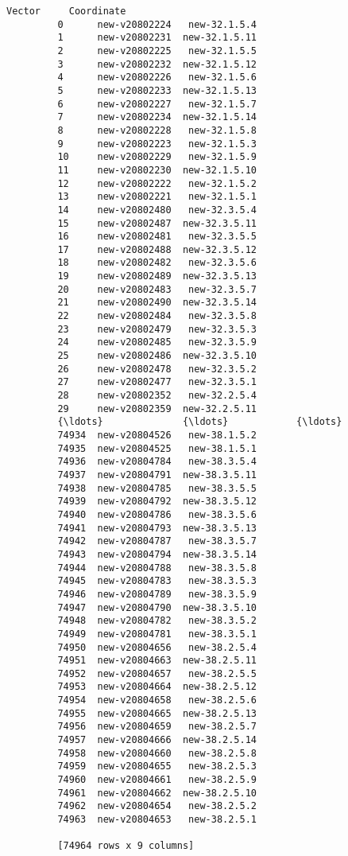 \documentclass[11pt]{article}
\begin{document}
\begin{Verbatim}[commandchars=\\\{\}]
                       Vector     Coordinate  
         0      new-v20802224   new-32.1.5.4  
         1      new-v20802231  new-32.1.5.11  
         2      new-v20802225   new-32.1.5.5  
         3      new-v20802232  new-32.1.5.12  
         4      new-v20802226   new-32.1.5.6  
         5      new-v20802233  new-32.1.5.13  
         6      new-v20802227   new-32.1.5.7  
         7      new-v20802234  new-32.1.5.14  
         8      new-v20802228   new-32.1.5.8  
         9      new-v20802223   new-32.1.5.3  
         10     new-v20802229   new-32.1.5.9  
         11     new-v20802230  new-32.1.5.10  
         12     new-v20802222   new-32.1.5.2  
         13     new-v20802221   new-32.1.5.1  
         14     new-v20802480   new-32.3.5.4  
         15     new-v20802487  new-32.3.5.11  
         16     new-v20802481   new-32.3.5.5  
         17     new-v20802488  new-32.3.5.12  
         18     new-v20802482   new-32.3.5.6  
         19     new-v20802489  new-32.3.5.13  
         20     new-v20802483   new-32.3.5.7  
         21     new-v20802490  new-32.3.5.14  
         22     new-v20802484   new-32.3.5.8  
         23     new-v20802479   new-32.3.5.3  
         24     new-v20802485   new-32.3.5.9  
         25     new-v20802486  new-32.3.5.10  
         26     new-v20802478   new-32.3.5.2  
         27     new-v20802477   new-32.3.5.1  
         28     new-v20802352   new-32.2.5.4  
         29     new-v20802359  new-32.2.5.11  
         {\ldots}              {\ldots}            {\ldots}  
         74934  new-v20804526   new-38.1.5.2  
         74935  new-v20804525   new-38.1.5.1  
         74936  new-v20804784   new-38.3.5.4  
         74937  new-v20804791  new-38.3.5.11  
         74938  new-v20804785   new-38.3.5.5  
         74939  new-v20804792  new-38.3.5.12  
         74940  new-v20804786   new-38.3.5.6  
         74941  new-v20804793  new-38.3.5.13  
         74942  new-v20804787   new-38.3.5.7  
         74943  new-v20804794  new-38.3.5.14  
         74944  new-v20804788   new-38.3.5.8  
         74945  new-v20804783   new-38.3.5.3  
         74946  new-v20804789   new-38.3.5.9  
         74947  new-v20804790  new-38.3.5.10  
         74948  new-v20804782   new-38.3.5.2  
         74949  new-v20804781   new-38.3.5.1  
         74950  new-v20804656   new-38.2.5.4  
         74951  new-v20804663  new-38.2.5.11  
         74952  new-v20804657   new-38.2.5.5  
         74953  new-v20804664  new-38.2.5.12  
         74954  new-v20804658   new-38.2.5.6  
         74955  new-v20804665  new-38.2.5.13  
         74956  new-v20804659   new-38.2.5.7  
         74957  new-v20804666  new-38.2.5.14  
         74958  new-v20804660   new-38.2.5.8  
         74959  new-v20804655   new-38.2.5.3  
         74960  new-v20804661   new-38.2.5.9  
         74961  new-v20804662  new-38.2.5.10  
         74962  new-v20804654   new-38.2.5.2  
         74963  new-v20804653   new-38.2.5.1  
         
         [74964 rows x 9 columns]
\end{Verbatim}
            
\end{document}
